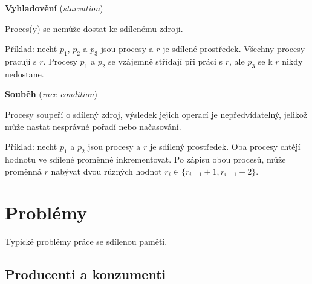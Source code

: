 \begin{compactitem}
    \item \textbf{Vyhladovění} (\textit{starvation}) \begin{compactitem}
        \item Proces(y) se nemůže dostat ke sdílenému zdroji.
        \item Příklad: nechť $p_1$, $p_2$ a $p_3$ jsou procesy a $r$ je sdílené prostředek. Všechny procesy pracují s $r$. Procesy $p_1$ a $p_2$ se vzájemně střídají při práci s $r$, ale $p_3$ se k $r$ nikdy nedostane.
    \end{compactitem}

    \item \textbf{Souběh} (\textit{race condition}) \begin{compactitem}
        \item Procesy soupeří o sdílený zdroj, výsledek jejich operací je nepředvídatelný, jelikož může nastat nesprávné pořadí nebo načasování.
        \item Příklad: nechť $p_1$ a $p_2$ jsou procesy a $r$ je sdílený prostředek. Oba procesy chtějí hodnotu ve sdílené proměnné inkrementovat. Po zápisu obou procesů, může proměnná $r$ nabývat dvou různých hodnot $r_i \in \{ r_{i-1} +1 , r_{i-1} +2 \}$.
    \end{compactitem}

\end{compactitem}


\section{Problémy}

\begin{compactitem}
    \item Typické problémy práce se sdílenou pamětí.
\end{compactitem}

\subsection{Producenti a konzumenti}

\begin{compactitem}
    \item {}
\end{compactitem}

